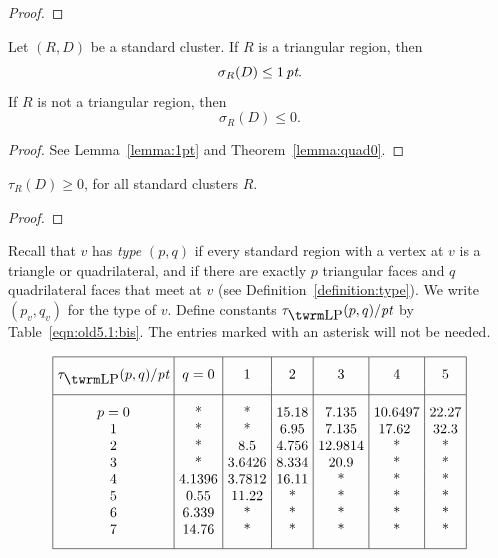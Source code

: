 \begin{proof} 
\end{proof}

\begin{lemma}  \label{lemma:0pt-1pt}
Let $(R,D)$ be a standard cluster.  If $R$ is a triangular
region, then
    $$\sigma_R(D)\le1\,\hbox{\it pt}.$$
If $R$ is not a triangular region, then
    $$\sigma_R(D)\le 0.$$
\end{lemma}

\begin{proof} See Lemma~\ref{lemma:1pt} and Theorem~\ref{lemma:quad0}.
\end{proof}

\begin{lemma}\label{lemma:roger0:bis}
    $\tau_R(D)\ge 0$, for all standard clusters $R$.
\end{lemma}

\begin{proof}  
\end{proof}



Recall that $v$ has {\it type\/} $(p,q)$ if every standard region
with a vertex at  $v$ is a triangle or quadrilateral, and if there
are exactly $p$ triangular faces and $q$ quadrilateral faces that
meet at $v$ (see Definition~\ref{definition:type}).  We write
$(p_v,q_v)$ for the type of $v$. Define constants $\tlp(p,q)/\pt$
by Table~\ref{eqn:old5.1:bis}. The entries marked with an asterisk
will not be needed.
%

\begin{equation}
\vbox{\offinterlineskip \hrule
\halign{&\vrule#&\strut\ \hfil#\hfil\ \cr   %
height 7pt&\omit&&\omit&&\omit&&\omit&&\omit&&\omit&&\omit&\cr
&\hfil $\tlp(p,q)/\pt$\hfil
        &&\hfil $q=0$\hfil
        &&\hfil1\hfil
        &&\hfil2\hfil
        &&\hfil3\hfil
        &&\hfil4\hfil
        &&\hfil5\hfil&
\cr height 7pt&\omit&&\omit&&\omit&&\omit&&\omit&&\omit&&\omit&\cr
\noalign{\hrule}
height7pt&\omit&&\omit&&\omit&&\omit&&\omit&&\omit&&\omit&\cr
&$p=0$&& *&& *&& 15.18&& 7.135&& 10.6497&& 22.27&\cr &1&&    *&&
*&&  6.95&& 7.135&&17.62  && 32.3&\cr &2&&    *&&
8.5&&4.756&&12.9814&&*&&*&\cr &3&& *&&
3.6426&&8.334&&20.9&&*&&*&\cr
&4&&4.1396&&3.7812&&16.11&&*&&*&&*&\cr
&5&&0.55&&11.22&&*&&*&&*&&*&\cr &6&&6.339&&*&&*&&*&&*&&*&\cr
&7&&14.76&&*&&*&&*&&*&&*&\cr
height7pt&\omit&&\omit&&\omit&&\omit&&\omit&&\omit&&\omit&\cr}
\hrule }
    \label{eqn:old5.1:bis}
\end{equation}

